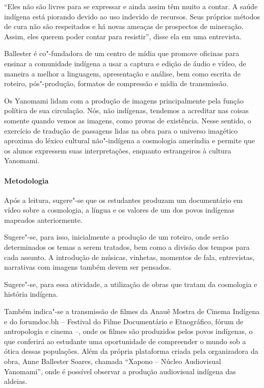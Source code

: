 \documentclass[12pt]{extarticle}
\begin{document}
{``Eles não são livres para se expressar e ainda assim têm muito a contar. A saúde indígena está 
piorando devido ao uso indevido de recursos. Seus próprios métodos de cura não são respeitados e 
há novas ameaças de prospectos de mineração. Assim, eles querem poder contar para resistir'', disse 
ela em uma entrevista.

Ballester é co"-fundadora de um centro de mídia que promove oficinas para ensinar a comunidade indígena a 
usar a captura e edição de áudio e vídeo, de maneira a melhor a linguagem, apresentação e análise, 
bem como escrita de roteiro, pós"-produção, formatos de compressão e mídia de transmissão.

Os Yanomami lidam com a produção de imagens principalmente pela função política de sua circulação.
Nós, não indígenas, tendemos a acreditar nas coisas somente quando vemos as imagens, como provas de 
existência. Nesse sentido, o exercício de tradução de passagens lidas na obra para o universo imagético 
aproxima do léxico cultural não"-indígena a cosmologia ameríndia e permite que os alunos expressem
suas interpretações, enquanto estrangeiros à cultura Yanomami. 

\paragraph{Metodologia}

Após a leitura, sugere"-se que os estudantes produzam um
documentário em vídeo sobre a cosmologia, a língua e os valores de um dos
povos indígenas mapeados anteriormente. 

Sugere"-se, para isso, inicialmente a produção de um roteiro, onde serão 
determinados os temas a serem tratados, bem como a divisão dos 
tempos para cada assunto. A introdução de músicas, vinhetas, momentos de fala,
entrevistas, narrativas com imagens também devem ser pensados.

Sugere"-se, para essa atividade, a utilização de obras que tratam da
cosmologia e história indígena. 

Também indica"-se a transmissão de filmes
da Anauê Mostra de Cinema Indígena e do forumdoc.bh – Festival do Filme 
Documentário e Etnográfico, fórum de antropologia e cinema –, onde os filmes
são produzidos pelos povos indígenas, o que conferirá ao estudante uma 
oportunidade de compreender o mundo sob a ótica dessas populações. Além da própria 
plataforma criada pela organizadora da obra, Anne Ballester Soares, chamada 
``Xapono -- Núcleo Audiovisual Yanomami'', onde é possível observar a produção 
audiovisual indígena das aldeias. 

}
\end{document}
